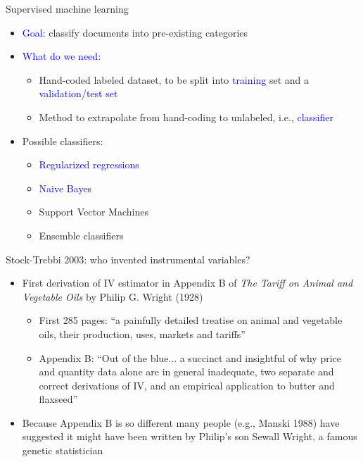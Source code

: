 \documentclass[english]{beamer}
\begin{document}
\begin{frame}{Supervised machine learning}
\begin{itemize}
\setlength{\itemsep}{1.2em}
\setlength{\itemindent}{-0.8em}
\item \textcolor{blue}{Goal}: classify documents into pre-existing categories

\item \textcolor{blue}{What do we need}: 
\vspace{4pt}
\begin{itemize}
\setlength{\itemindent}{-1.5em}
\setlength{\itemsep}{0.5em}
\item Hand-coded labeled dataset, to be split into \textcolor{blue}{training} set and a\\
\hspace{-14pt}\textcolor{blue}{validation/test set}
\item Method to extrapolate from hand-coding to unlabeled, i.e., \textcolor{blue}{classifier}
\end{itemize}

\item Possible classifiers:
\vspace{4pt}
\begin{itemize}
\setlength{\itemindent}{-1.5em}
\setlength{\itemsep}{0.5em}
\item \textcolor{blue}{Regularized regressions}
\item \textcolor{blue}{Naive Bayes}
\item Support Vector Machines
\item Ensemble classifiers
\end{itemize}
 
\end{itemize}
\end{frame}

\begin{frame}{Stock-Trebbi 2003: who invented instrumental variables?}
\begin{itemize}
\setlength{\itemsep}{0.7em}
\item First derivation of IV estimator in Appendix B of \textit{The Tariff on Animal and Vegetable Oils} by Philip G. Wright (1928)

\vspace{5pt}

\begin{itemize}
\setlength{\itemsep}{0.5em}
\item First 285 pages: ``a painfully detailed treatise on animal and vegetable oils, their production, uses, markets and tariffs''
\item Appendix B: ``Out of the blue... a succinct and insightful of why price and quantity data alone are in general inadequate, two separate and correct derivations of IV, and an empirical application to butter and flaxseed''
\end{itemize}
 \item Because Appendix B is so different many people (e.g., Manski 1988) have suggested it might have been written by Philip's son Sewall Wright, a famous genetic statistician
\end{itemize}
\end{frame}
\end{document}
